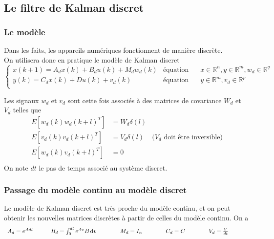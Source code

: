 \documentclass[12pt,twoside,a4paper]{article}
\begin{document}
\subsection{Le filtre de Kalman discret}

\subsubsection{Le modèle}
Dans les faits, les appareils numériques fonctionnent de manière discrète. \\
On utilisera donc en pratique le modèle de Kalman discret
$$
\left\{
\begin{array}{lll}
        x(k+1) = A_d x(k) + B_d u(k) +M_d w_d(k) & \text{équation d'état} & x \in \mathbb{R}^n, y \in \mathbb{R}^m, w_d \in \mathbb{R}^q\\
       y(k) = C_d x(k) + Du(k) + v_d(k) & \text{équation de mesure} & y \in \mathbb{R}^m, v_d \in \mathbb{R}^p\\
\end{array}
\right.
$$

Les signaux $w_d$ et $v_d$ sont cette fois associés à des matrices de covariance $W_d$ et $V_d$ telles que
$$
\begin{array}{lll}
E[w_d(k) w_d(k+l)^T ] &= W_d \delta(l) &  \\
E[v_d(k) v_d(k+l)^T ] &= V_d \delta(l) & \text{($V_d$ doit être inversible)}\\
E[w_d(k) v_d(k+l)^T ] &= 0 & \\
\end{array}
$$
On note $dt$ le pas de temps associé au système discret.\\

\subsubsection{Passage du modèle continu au modèle discret}

\vspace{0.3cm}
Le modèle de Kalman discret est très proche du modèle continu, et on peut obtenir les nouvelles matrices discrètes à partir de celles du modèle continu. On a
$$ \begin{array}{ccccc}
A_d = e^{Adt} \rule[0pt]{30pt}{0pt}
B_d = \int_0^{dt} e^{Av}B \, \mathrm{d}v \rule[0pt]{30pt}{0pt}&
M_d = I_n \rule[0pt]{30pt}{0pt}&
C_d = C\rule[0pt]{30pt}{0pt} &
V_d= \frac{V}{dt}\rule[0pt]{30pt}{0pt}\\
\end{array} $$
\end{document}
